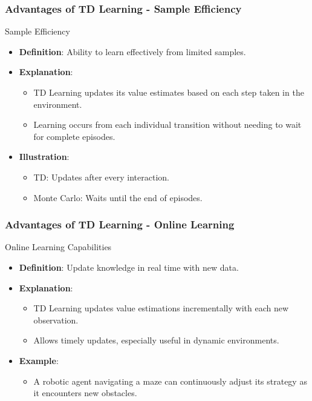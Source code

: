 \documentclass[aspectratio=169]{beamer}
\begin{document}
\begin{frame}[fragile]
    \frametitle{Advantages of TD Learning - Sample Efficiency}
    \begin{block}{Sample Efficiency}
        \begin{itemize}
            \item \textbf{Definition}: Ability to learn effectively from limited samples.
            \item \textbf{Explanation}:
                \begin{itemize}
                    \item TD Learning updates its value estimates based on each step taken in the environment.
                    \item Learning occurs from each individual transition without needing to wait for complete episodes.
                \end{itemize}
            \item \textbf{Illustration}:
                \begin{itemize}
                    \item TD: Updates after every interaction.
                    \item Monte Carlo: Waits until the end of episodes.
                \end{itemize}
        \end{itemize}
    \end{block}
\end{frame}

\begin{frame}[fragile]
    \frametitle{Advantages of TD Learning - Online Learning}
    \begin{block}{Online Learning Capabilities}
        \begin{itemize}
            \item \textbf{Definition}: Update knowledge in real time with new data.
            \item \textbf{Explanation}:
                \begin{itemize}
                    \item TD Learning updates value estimations incrementally with each new observation.
                    \item Allows timely updates, especially useful in dynamic environments.
                \end{itemize}
            \item \textbf{Example}:
                \begin{itemize}
                    \item A robotic agent navigating a maze can continuously adjust its strategy as it encounters new obstacles.
                \end{itemize}
        \end{itemize}
    \end{block}
\end{frame}
\end{document}
